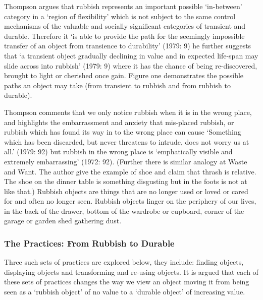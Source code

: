 Thompson argues that rubbish represents an important possible ‘in-between’ category in a ‘region of flexibility’ which is not subject to the same control mechanisms of the valuable and socially significant categories of transient and durable. Therefore it ‘is able to provide the path for the seemingly impossible transfer of an object from transience to durability’ (1979: 9) he further suggests that ‘a transient object gradually declining in value and in expected life-span may slide across into rubbish’ (1979: 9) where it has the chance of being re-discovered, brought to light or cherished once gain. Figure one demonstrates the possible paths an object may take (from transient to rubbish and from rubbish to durable). 

Thompson comments that we only notice rubbish when it is in the wrong place, and highlights the embarrassment and anxiety that mis-placed rubbish, or rubbish which has found its way in to the wrong place can cause ‘Something which has been discarded, but never threatens to intrude, does not worry us at all.’ (1979: 92) but rubbish in the wrong place is ‘emphatically visible and extremely embarrassing’ (1972: 92). (Further there is similar analogy at Waste and Want. The author give the example of shoe and claim that thrash is relative. The shoe on the dinner table is something disgusting but in the foots is not at like that.) Rubbish objects are things that are no longer used or loved or cared for and often no longer seen. Rubbish objects linger on the periphery of our lives, in the back of the drawer, bottom of the wardrobe or cupboard, corner of the garage or garden shed gathering dust.


\subsubsection{The Practices: From Rubbish to Durable}
Three such sets of practices are explored below, they include: finding objects, displaying objects and transforming and re-using objects. It is argued that each of these sets of practices changes the way we view an object moving it from being seen as a ‘rubbish object’ of no value to a ‘durable object’ of increasing value.

